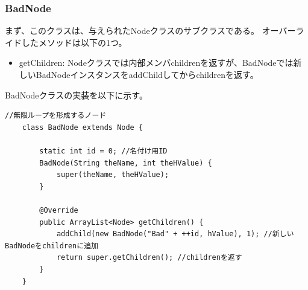 \documentclass{jarticle}
\begin{document}
\subsubsection{BadNode}

まず、このクラスは、与えられたNodeクラスのサブクラスである。
オーバーライドしたメソッドは以下の1つ。
\begin{itemize}
\item getChildren: Nodeクラスでは内部メンバchildrenを返すが、BadNodeでは新しいBadNodeインスタンスをaddChildしてからchildrenを返す。

\end{itemize}

BadNodeクラスの実装を以下に示す。
\begin{lstlisting}[caption=BadNodeクラス(Search3.java),label=src:BadNode]
    //無限ループを形成するノード
    class BadNode extends Node {

        static int id = 0; //名付け用ID
        BadNode(String theName, int theHValue) {
            super(theName, theHValue);
        }

        @Override
        public ArrayList<Node> getChildren() {
            addChild(new BadNode("Bad" + ++id, hValue), 1); //新しいBadNodeをchildrenに追加
            return super.getChildren(); //childrenを返す
        }
    }
\end{lstlisting}
\end{document}
